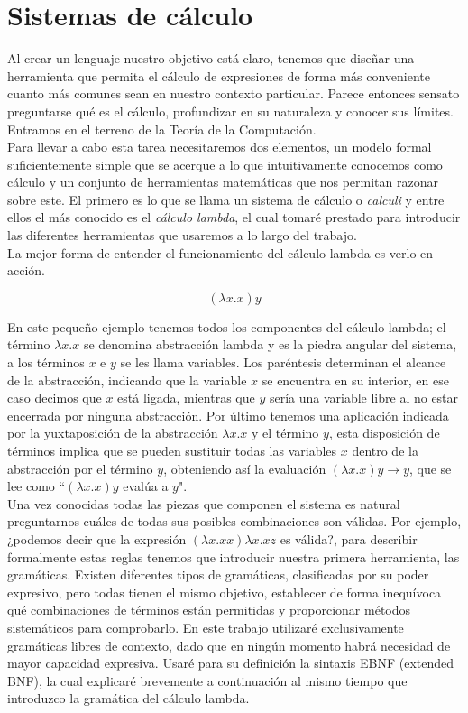 \chapter{Sistemas de cálculo} \label{sect:sistemas_de_calculo}

Al crear un lenguaje nuestro objetivo está claro, tenemos que diseñar una herramienta que permita el cálculo de expresiones de forma más conveniente cuanto más comunes sean en nuestro contexto particular. Parece entonces sensato preguntarse qué es el cálculo, profundizar en su naturaleza y conocer sus límites. Entramos en el terreno de la Teoría de la Computación.\\
Para llevar a cabo esta tarea necesitaremos dos elementos, un modelo formal suficientemente simple que se acerque a lo que intuitivamente conocemos como cálculo y un conjunto de herramientas matemáticas que nos permitan razonar sobre este. El primero es lo que se llama un sistema de cálculo o \textit{calculi} y entre ellos el más conocido es el \textit{cálculo lambda}, el cual tomaré prestado para introducir las diferentes herramientas que usaremos a lo largo del trabajo.\\

La mejor forma de entender el funcionamiento del cálculo lambda es verlo en acción.

$$(\lambda x.x) y$$

En este pequeño ejemplo tenemos todos los componentes del cálculo lambda; el término $\lambda x.x$ se denomina abstracción lambda y es la piedra angular del sistema, a los términos $x$ e $y$ se les llama variables. Los paréntesis determinan el alcance de la abstracción, indicando que la variable $x$ se encuentra en su interior, en ese caso decimos que $x$ está ligada, mientras que $y$ sería una variable libre al no estar encerrada por ninguna abstracción.
Por último tenemos una aplicación indicada por la yuxtaposición de la abstracción $\lambda x.x$ y el término $y$, esta disposición de términos implica que se pueden sustituir todas las variables $x$ dentro de la abstracción por el término $y$, obteniendo así la evaluación $(\lambda x.x) y \to y$, que se lee como ``$(\lambda x.x) y$ evalúa a $y$".\\


Una vez conocidas todas las piezas que componen el sistema es natural preguntarnos cuáles de todas sus posibles combinaciones son válidas. Por ejemplo, ¿podemos decir que la expresión  $(\lambda x.xx) \lambda x.xz$ es válida?, para describir formalmente estas reglas tenemos que introducir nuestra primera herramienta, las gramáticas. Existen diferentes tipos de gramáticas, clasificadas por su poder expresivo, pero todas tienen el mismo objetivo, establecer de forma inequívoca qué combinaciones de términos están permitidas y proporcionar métodos sistemáticos para comprobarlo. En este trabajo utilizaré exclusivamente gramáticas libres de contexto, dado que en ningún momento habrá necesidad de mayor capacidad expresiva. Usaré para su definición la sintaxis EBNF (extended \acs{BNF}), la cual explicaré brevemente a continuación al mismo tiempo que introduzco la gramática del cálculo lambda.\\

